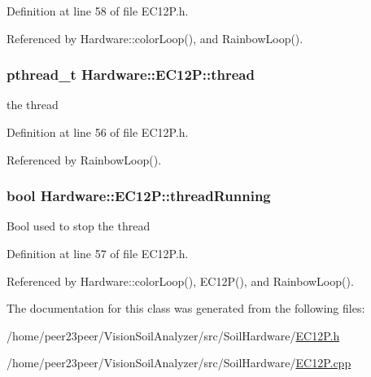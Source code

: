 Definition at line 58 of file E\+C12\+P.\+h.



Referenced by Hardware\+::color\+Loop(), and Rainbow\+Loop().

\hypertarget{class_hardware_1_1_e_c12_p_a718a90836ff46cd71d18ce099a656533}{}
\subsubsection[{thread}]{\setlength{\rightskip}{0pt plus 5cm}pthread\+\_\+t Hardware\+::\+E\+C12\+P\+::thread\hspace{0.3cm}{\ttfamily [private]}}\label{class_hardware_1_1_e_c12_p_a718a90836ff46cd71d18ce099a656533}
the thread 

Definition at line 56 of file E\+C12\+P.\+h.



Referenced by Rainbow\+Loop().

\hypertarget{class_hardware_1_1_e_c12_p_a81af8167f5a5192d8575ebad04952d57}{}
\subsubsection[{thread\+Running}]{\setlength{\rightskip}{0pt plus 5cm}bool Hardware\+::\+E\+C12\+P\+::thread\+Running\hspace{0.3cm}{\ttfamily [private]}}\label{class_hardware_1_1_e_c12_p_a81af8167f5a5192d8575ebad04952d57}
Bool used to stop the thread 

Definition at line 57 of file E\+C12\+P.\+h.



Referenced by Hardware\+::color\+Loop(), E\+C12\+P(), and Rainbow\+Loop().



The documentation for this class was generated from the following files\+:\begin{DoxyCompactItemize}
\item 
/home/peer23peer/\+Vision\+Soil\+Analyzer/src/\+Soil\+Hardware/\hyperlink{_e_c12_p_8h}{E\+C12\+P.\+h}\item 
/home/peer23peer/\+Vision\+Soil\+Analyzer/src/\+Soil\+Hardware/\hyperlink{_e_c12_p_8cpp}{E\+C12\+P.\+cpp}\end{DoxyCompactItemize}

